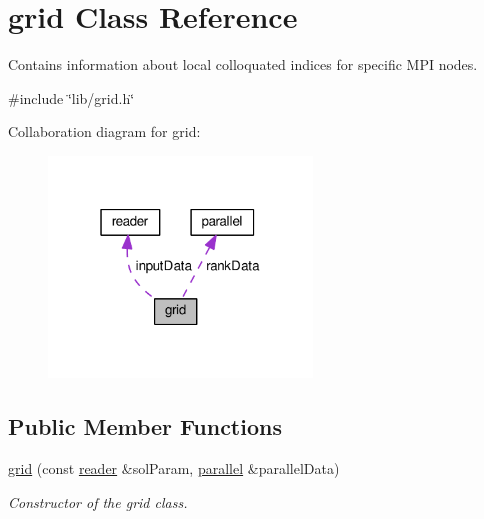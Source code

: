 \hypertarget{classgrid}{}\section{grid Class Reference}
\label{classgrid}


Contains information about local colloquated indices for specific M\+PI nodes.  




{\ttfamily \#include \char`\"{}lib/grid.\+h\char`\"{}}



Collaboration diagram for grid\+:\nopagebreak
\begin{figure}[H]
\begin{center}
\leavevmode
\includegraphics[width=199pt]{classgrid__coll__graph}
\end{center}
\end{figure}
\subsection*{Public Member Functions}
\begin{DoxyCompactItemize}
\item 
\hyperlink{classgrid_ab650e567f3921803ad1a065bd924dae5}{grid} (const \hyperlink{classreader}{reader} \&sol\+Param, \hyperlink{classparallel}{parallel} \&parallel\+Data)
\begin{DoxyCompactList}\small\item\em Constructor of the grid class. \end{DoxyCompactList}\end{DoxyCompactItemize}
